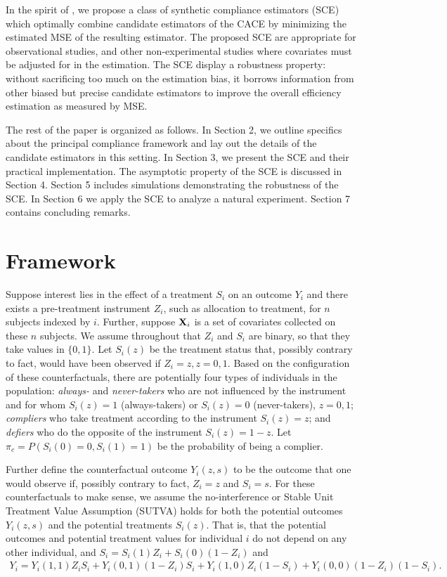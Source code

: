 \documentclass{article}
\begin{document}
In the spirit of \citet{antonelli2017synthetic}, we propose a class of synthetic compliance estimators (SCE) which optimally combine candidate estimators of the CACE by minimizing the estimated MSE of the resulting estimator. The proposed SCE are appropriate for observational studies, and other non-experimental studies where covariates must be adjusted for in the estimation.  The SCE display a robustness property: without sacrificing too much on the estimation bias, it borrows information from other biased but precise candidate estimators to improve the overall efficiency estimation as measured by MSE. 

The rest of the paper is organized as follows. In Section 2, we outline specifics about the principal compliance framework and lay out the details of the candidate estimators in this setting. In Section 3, we present the SCE and their practical implementation. The asymptotic property of the SCE is discussed in Section 4.  Section 5 includes simulations demonstrating the robustness of the SCE. In Section 6 we apply the SCE to analyze a natural experiment. Section 7 contains concluding remarks.


\section{Framework}
Suppose interest lies in the effect of a treatment $S_i$ on an outcome $Y_i$ and there exists a pre-treatment instrument $Z_i$, such as allocation to treatment, for $n$ subjects indexed by $i$. Further, suppose ${\bf X}_i$ is a set of covariates collected on these $n$ subjects. We assume throughout that $Z_i$ and $S_i$ are binary, so that they take values in $\{0, 1\}$. Let $S_i(z)$ be the treatment status that, possibly contrary to fact, would have been observed if $Z_i = z, z = 0, 1$. Based on the configuration of these counterfactuals, there are potentially four types of individuals in the population: \textit{always-} and \textit{never-takers} who are not influenced by the instrument and for whom $S_i(z) = 1$ (always-takers) or $S_i(z) = 0$ (never-takers), $z = 0, 1$; \textit{compliers} who take treatment according to the instrument $S_i(z) = z$; and \textit{defiers} who do the opposite of the instrument $S_i(z) = 1 - z$. Let $\pi_c = P(S_i(0) = 0, S_i(1) = 1)$ be the probability of being a complier. 

Further define the counterfactual outcome $Y_i(z, s)$ to be the outcome that one would observe if, possibly contrary to fact, $Z_i = z$ and $S_i = s$. For these counterfactuals to make sense, we assume the no-interference or Stable Unit Treatment Value Assumption (SUTVA) holds \citep{rubin1978bayesian} for both the potential outcomes $Y_i(z,s)$ and the potential treatments $S_i(z)$. That is, that the potential outcomes and potential treatment values for individual $i$ do not depend on any other individual, and $S_i = S_i(1)Z_i + S_i(0)(1-Z_i)$ and 
\begin{align*}
    Y_i = Y_i(1, 1)Z_iS_i + Y_i(0, 1)(1-Z_i)S_i + Y_i(1, 0)Z_i(1-S_i) + Y_i(0, 0)(1-Z_i)(1-S_i).
\end{align*} 
\end{document}
